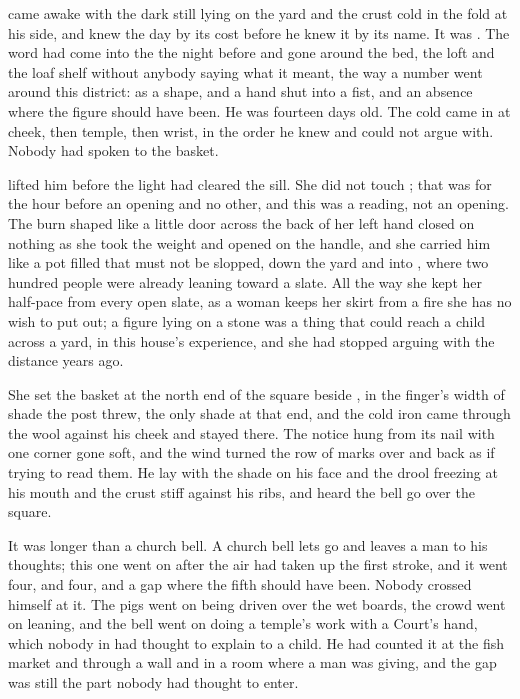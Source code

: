 
 came awake with the dark still lying on the yard and the crust cold in the fold at his side, and knew the day by its cost before he knew it by its name. It was . The word had come into the  the night before and gone around the bed, the loft and the loaf shelf without anybody saying what it meant, the way a number went around this district: as a shape, and a hand shut into a fist, and an absence where the figure should have been. He was fourteen days old. The cold came in at cheek, then temple, then wrist, in the order he knew and could not argue with. Nobody had spoken to the basket.

 lifted him before the light had cleared the sill. She did not touch ; that was for the hour before an opening and no other, and this was a reading, not an opening. The burn shaped like a little door across the back of her left hand closed on nothing as she took the weight and opened on the handle, and she carried him like a pot filled that must not be slopped, down the yard and into , where two hundred people were already leaning toward a slate. All the way she kept her half-pace from every open slate, as a woman keeps her skirt from a fire she has no wish to put out; a figure lying on a stone was a thing that could reach a child across a yard, in this house's experience, and she had stopped arguing with the distance years ago.

She set the basket at the north end of the square beside , in the finger's width of shade the post threw, the only shade at that end, and the cold iron came through the wool against his cheek and stayed there. The notice hung from its nail with one corner gone soft, and the wind turned the row of marks over and back as if trying to read them. He lay with the shade on his face and the drool freezing at his mouth and the crust stiff against his ribs, and heard the bell go over the square.

It was longer than a church bell. A church bell lets go and leaves a man to his thoughts; this one went on after the air had taken up the first stroke, and it went four, and four, and a gap where the fifth should have been. Nobody crossed himself at it. The pigs went on being driven over the wet boards, the crowd went on leaning, and the bell went on doing a temple's work with a Court's hand, which nobody in  had thought to explain to a child. He had counted it at the fish market and through a wall and in a room where a man was giving, and the gap was still the part nobody had thought to enter.

